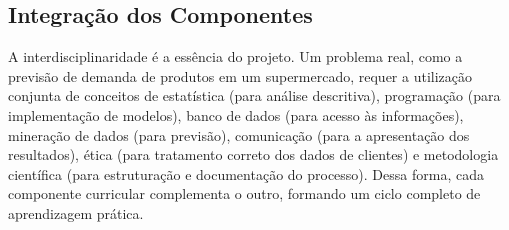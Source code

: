    \subsection{Integração dos Componentes}

        A interdisciplinaridade é a essência do projeto. Um problema real, como a previsão de demanda de produtos em um supermercado, requer a utilização conjunta de conceitos de estatística (para análise descritiva), programação (para implementação de modelos), banco de dados (para acesso às informações), mineração de dados (para previsão), comunicação (para a apresentação dos resultados), ética (para tratamento correto dos dados de clientes) e metodologia científica (para estruturação e documentação do processo). Dessa forma, cada componente curricular complementa o outro, formando um ciclo completo de aprendizagem prática.




